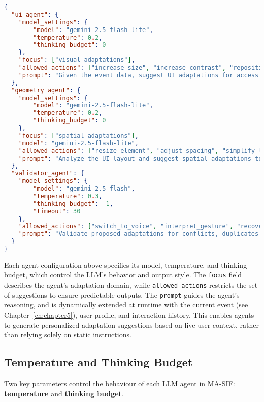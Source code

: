 \begin{lstlisting}[language=json,firstnumber=1, caption={Basic example of a 2-agent (+ validator) configuration}]
{
  "ui_agent": {
    "model_settings": {
        "model": "gemini-2.5-flash-lite",
        "temperature": 0.2,
        "thinking_budget": 0
    },
    "focus": ["visual adaptations"],
    "allowed_actions": ["increase_size", "increase_contrast", "reposition_element"],
    "prompt": "Given the event data, suggest UI adaptations for accessibility. Consider user profile and interaction history."
  },
  "geometry_agent": {
    "model_settings": {
        "model": "gemini-2.5-flash-lite",
        "temperature": 0.2,
        "thinking_budget": 0
    },
    "focus": ["spatial adaptations"],
    "model": "gemini-2.5-flash-lite",
    "allowed_actions": ["resize_element", "adjust_spacing", "simplify_layout"],
    "prompt": "Analyze the UI layout and suggest spatial adaptations to improve usability for motor-impaired users."
  },
  "validator_agent": {
    "model_settings": {
        "model": "gemini-2.5-flash",
        "temperature": 0.3,
        "thinking_budget": -1,
        "timeout": 30
    },
    "allowed_actions": ["switch_to_voice", "interpret_gesture", "recover_from_error", "increase_size", "increase_contrast", "reposition_element","resize_element", "adjust_spacing", "simplify_layout"],
    "prompt": "Validate proposed adaptations for conflicts, duplicates and inconsistencies based on user context, events and interaction history."
  }
}
\end{lstlisting}
Each agent configuration above specifies its model, temperature, and thinking budget, which control the LLM's behavior and output style. The \texttt{focus} field describes the agent's adaptation domain, while \texttt{allowed\_actions} restricts the set of suggestions to ensure predictable outputs. The \texttt{prompt} guides the agent's reasoning, and is dynamically extended at runtime with the current event (see Chapter~\ref{ch:chapter5}), user profile, and interaction history. This enables agents to generate personalized adaptation suggestions based on live user context, rather than relying solely on static instructions.

\subsection{Temperature and Thinking Budget}

Two key parameters control the behaviour of each LLM agent in MA-SIF: \textbf{temperature} and \textbf{thinking budget}.

